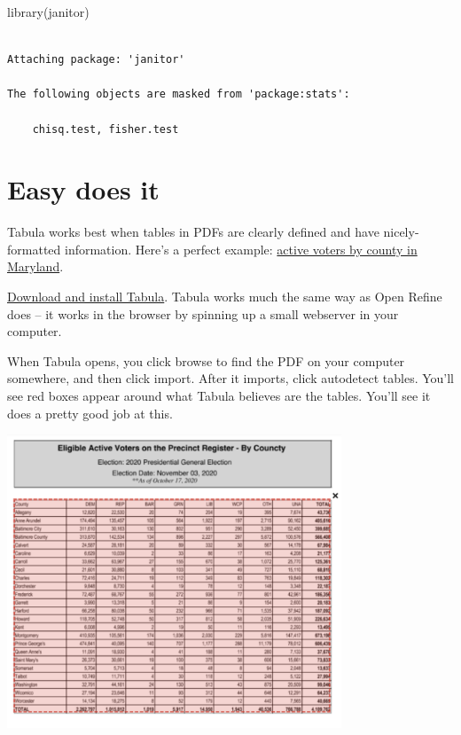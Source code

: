 \documentclass[
  letterpaper,
  DIV=11,
  numbers=noendperiod]{scrreprt}
\newenvironment{Shaded}{\begin{snugshade}}{\end{snugshade}}
\newcommand{\FunctionTok}[1]{\textcolor[rgb]{0.28,0.35,0.67}{#1}}
\newcommand{\NormalTok}[1]{\textcolor[rgb]{0.00,0.23,0.31}{#1}}
\begin{document}
\begin{Shaded}
\begin{Highlighting}[]
\FunctionTok{library}\NormalTok{(janitor)}
\end{Highlighting}
\end{Shaded}

\begin{verbatim}

Attaching package: 'janitor'

The following objects are masked from 'package:stats':

    chisq.test, fisher.test
\end{verbatim}

\hypertarget{easy-does-it}{%
\section{Easy does it}\label{easy-does-it}}

Tabula works best when tables in PDFs are clearly defined and have
nicely-formatted information. Here's a perfect example:
\href{https://elections.maryland.gov/press_room/2020_stats/Eligible\%20Active\%20Voters\%20by\%20County\%20-\%20PG20.pdf}{active
voters by county in Maryland}.

\href{https://tabula.technology/}{Download and install Tabula}. Tabula
works much the same way as Open Refine does -- it works in the browser
by spinning up a small webserver in your computer.

When Tabula opens, you click browse to find the PDF on your computer
somewhere, and then click import. After it imports, click autodetect
tables. You'll see red boxes appear around what Tabula believes are the
tables. You'll see it does a pretty good job at this.

\includegraphics[width=3.93in,height=\textheight]{./images/md_voters.png}
\end{document}
